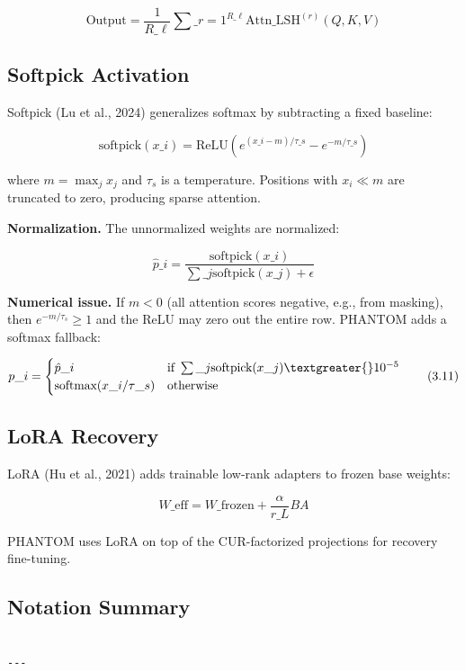 \[
\text{Output} = \frac{1}{R\_\ell} \sum\_{r=1}^{R\_\ell} \text{Attn}\_{\text{LSH}}^{(r)}(Q, K, V)
\tag{3.8}
\]

\subsection{Softpick Activation}

Softpick (Lu et al., 2024) generalizes softmax by subtracting a fixed baseline:

\[
\text{softpick}(x\_i) = \text{ReLU}\!\left(e^{(x\_i - m)/\tau\_s} - e^{-m/\tau\_s}\right)
\tag{3.9}
\]

where $m = \max_j x_j$ and $\tau_s$ is a temperature. Positions with 
$x_i \ll m$ are truncated to zero, producing sparse attention.

\textbf{Normalization.} The unnormalized weights are normalized:

\[
\hat{p}\_i = \frac{\text{softpick}(x\_i)}{\sum\_j \text{softpick}(x\_j) + \epsilon}
\tag{3.10}
\]

\textbf{Numerical issue.} If $m < 0$ (all attention scores negative, e.g., from 
masking), then $e^{-m/\tau_s} \geq 1$ and the ReLU may zero out the entire 
row. PHANTOM adds a softmax fallback:

\[
p\_i = \begin{cases} \hat{p}\_i & \text{if } \sum\_j \text{softpick}(x\_j) \textgreater{} 10^{-5} \\ \text{softmax}(x\_i / \tau\_s) & \text{otherwise} \end{cases}
\tag{3.11}
\]

\subsection{LoRA Recovery}

LoRA (Hu et al., 2021) adds trainable low-rank adapters to frozen base weights:

\[
W\_\text{eff} = W\_\text{frozen} + \frac{\alpha}{r\_L} B A
\tag{3.12}
\]

PHANTOM uses LoRA on top of the CUR-factorized projections for recovery 
fine-tuning.

\subsection{Notation Summary}

\begin{lstlisting}

---
\end{lstlisting}

